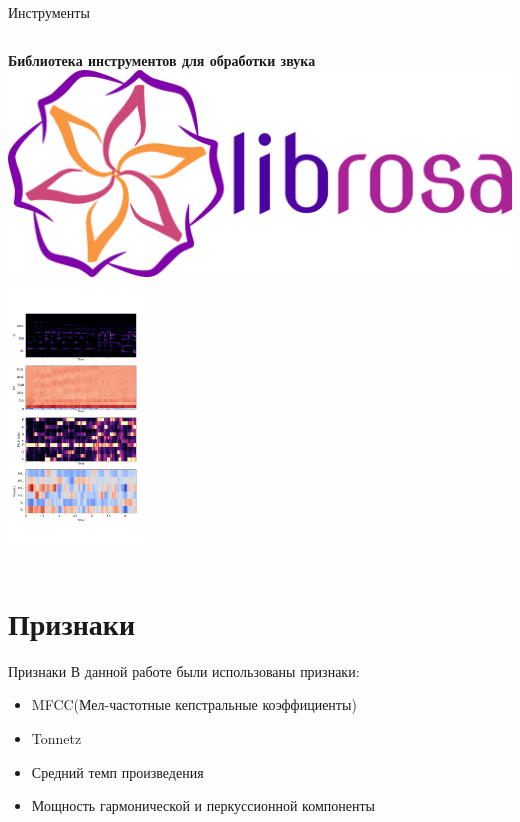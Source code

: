\documentclass[c, aspectratio = 43]{beamer}
\begin{document}
\begin{frame}{Инструменты}
    \begin{columns}
        \textbf{Библиотека инструментов для обработки звука}\\
        \vspace{1cm}
        \includegraphics[width=\linewidth]{librosa.png}
        \centering
        \includegraphics[height=7cm]{features.png}
    \end{columns}
\end{frame}


\section{Признаки}
\begin{frame}{Признаки}
В данной работе были использованы признаки:
\begin{itemize}
    \item MFCC(Мел-частотные кепстральные коэффициенты)
    \item Tonnetz
    \item Средний темп произведения
    \item Мощность гармонической и перкуссионной компоненты
\end{itemize}
\end{frame}
\end{document}
